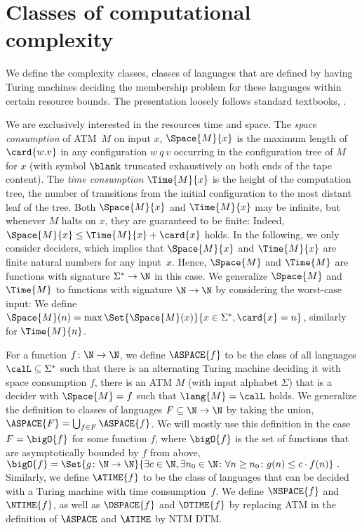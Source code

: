 \documentclass[../../diss.tex]{subfiles}
\begin{document}
\section{Classes of computational complexity}%
\label{Section:Complexity}%

We define the complexity classes, classes of languages that are defined by having Turing machines deciding the membership problem for these languages within certain resource bounds.
The presentation loosely follows standard textbooks, \eg \cite{Kozen06}.

We are exclusively interested in the resources time and space.
The \emph{space consumption} of ATM~$M$ on input $x$, $\Space{M}{x}$ is the maximum length of $\card{w.v}$ in any configuration $w \ q \ v$ occurring in the configuration tree of $M$ for $x$ (with symbol $\blank$ truncated exhaustively on both ends of the tape content).
The \emph{time consumption} $\Time{M}{x}$ is the height of the computation tree, the number of transitions from the initial configuration to the most distant leaf of the tree.
Both $\Space{M}{x}$ and $\Time{M}{x}$ may be infinite, but whenever $M$ halts on $x$, they are guaranteed to be finite:
Indeed, $\Space{M}{x} \leq \Time{M}{x} + \card{x}$ holds.
In the following, we only consider deciders, which implies that $\Space{M}{x}$ and $\Time{M}{x}$ are finite natural numbers for any input~$x$.
Hence, $\Space{M}$ and $\Time{M}$ are functions with signature $\Sigma^* \to \N$ in this case.
We generalize $\Space{M}$ and $\Time{M}$ to functions with signature $\N \to \N$ by considering the worst-case input:
We define $\Space{M}(n) = \max \Set{ \Space{M}(x) }{ x \in \Sigma^*, \card{x} = n}$, similarly for $\Time{M}{n}$.


For a function $f \colon \N \to \N$, we define $\ASPACE{f}$ to be the class of all languages $\calL \subseteq \Sigma^*$ such that there is an alternating Turing machine deciding it with space consumption $f$, \ie there is an ATM $M$ (with input alphabet $\Sigma$) that is a decider with $\Space{M} = f$ such that $\lang{M} = \calL$ holds.
We generalize the definition to classes of languages $F \subseteq \N \to \N$ by taking the union, \ie $\ASPACE{F} = \bigcup_{f \in F} \ASPACE{f}$.
We will mostly use this definition in the case $F = \bigO{f}$ for some function $f$, where $\bigO{f}$ is the set of functions that are asymptotically bounded by $f$ from above,
\(
    \bigO{f} = \Set{ g \colon \N \to \N}{ \exists c \in \N, \exists n_0 \in \N \colon \forall n \geq n_0 \colon g(n) \leq c \cdot f(n)}
    \ .
\)
Similarly, we define $\ATIME{f}$ to be the class of languages that can be decided with a Turing machine with time consumption~$f$.
We define $\NSPACE{f}$ and $\NTIME{f}$, as well as $\DSPACE{f}$ and $\DTIME{f}$ by replacing ATM in the definition of $\ASPACE$ and $\ATIME$ by NTM \resp DTM.\@
\end{document}
